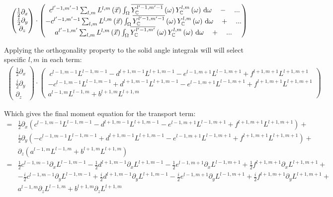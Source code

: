 \documentclass[10pt]{scrartcl}
\begin{document}
\begin{align*}
\begin{pmatrix}
\frac{1}{2}\partial_x\\
\frac{i}{2}\partial_y\\
\partial_z
\end{pmatrix}
\cdot
\begin{pmatrix}
\ c^{l'-1, m'-1}\sum_{l,m}{L^{l,m}\left(\vec{x}\right )\int_\Omega{\overline{Y_{\mathbb{C}}^{l'-1,m'-1}}\left(\omega\right)Y_{\mathbb{C}}^{l,m}\left(\omega\right)\,\mathrm{d}\omega}} \quad - \quad ...\\
-c^{l'-1, m'-1}\sum_{l,m}{L^{l,m}\left(\vec{x}\right )\int_\Omega{\overline{Y_{\mathbb{C}}^{l'-1,m'-1}}\left(\omega\right)Y_{\mathbb{C}}^{l,m}\left(\omega\right)\,\mathrm{d}\omega}} \quad + \quad ... \\
a^{l'-1, m'}\sum_{l,m}{L^{l,m}\left(\vec{x}\right )\int_\Omega{\overline{Y_{\mathbb{C}}^{l'-1,m'}}\left(\omega\right)Y_{\mathbb{C}}^{l,m}\left(\omega\right)\,\mathrm{d}\omega}} \quad + \quad ...
\end{pmatrix}
\end{align*}

Applying the orthogonality property to the solid angle integrals will will select specific $l,m$ in each term:
\begin{align*}
\begin{pmatrix}
\frac{1}{2}\partial_x\\
\frac{i}{2}\partial_y\\
\partial_z
\end{pmatrix}
\cdot
\begin{pmatrix}
\ c^{l-1, m-1}L^{l-1,m-1} - d^{l+1, m-1}L^{l+1,m-1} - e^{l-1, m+1}L^{l-1,m+1} + f^{l+1, m+1}L^{l+1,m+1}\\
-c^{l-1, m-1}L^{l-1,m-1} + d^{l+1, m-1}L^{l+1,m-1} - e^{l-1, m+1}L^{l-1,m+1} + f^{l+1, m+1}L^{l+1,m+1} \\
a^{l-1, m}L^{l-1,m}+b^{l+1, m}L^{l+1,m}
\end{pmatrix}
\end{align*}

Which gives the final moment equation for the transport term:
\begin{align*}
=
&\frac{1}{2}\partial_x\left(c^{l-1, m-1}L^{l-1,m-1} - d^{l+1, m-1}L^{l+1,m-1} - e^{l-1, m+1}L^{l-1,m+1} + f^{l+1, m+1}L^{l+1,m+1}\right) + \\
&\frac{i}{2}\partial_y\left( -c^{l-1, m-1}L^{l-1,m-1} + d^{l+1, m-1}L^{l+1,m-1} - e^{l-1, m+1}L^{l-1,m+1} + f^{l+1, m+1}L^{l+1,m+1} \right) + \\
&\partial_z\left( a^{l-1, m}L^{l-1,m}+b^{l+1, m}L^{l+1,m} \right)
\\
=
&
\frac{1}{2}c^{l-1, m-1}\partial_x L^{l-1,m-1} - \frac{1}{2}d^{l+1, m-1}\partial_x L^{l+1,m-1} - \frac{1}{2}e^{l-1, m+1}\partial_x L^{l-1,m+1} + \frac{1}{2}f^{l+1, m+1}\partial_x L^{l+1,m+1}+
\\
&-\frac{i}{2}c^{l-1, m-1}\partial_y L^{l-1,m-1} + \frac{i}{2}d^{l+1, m-1}\partial_y L^{l+1,m-1} - \frac{i}{2}e^{l-1, m+1}\partial_y L^{l-1,m+1} + \frac{i}{2}f^{l+1, m+1}\partial_y L^{l+1,m+1}+
\\
&
a^{l-1, m}\partial_z L^{l-1,m}+b^{l+1, m}\partial_z L^{l+1,m}
\end{align*}
\end{document}
